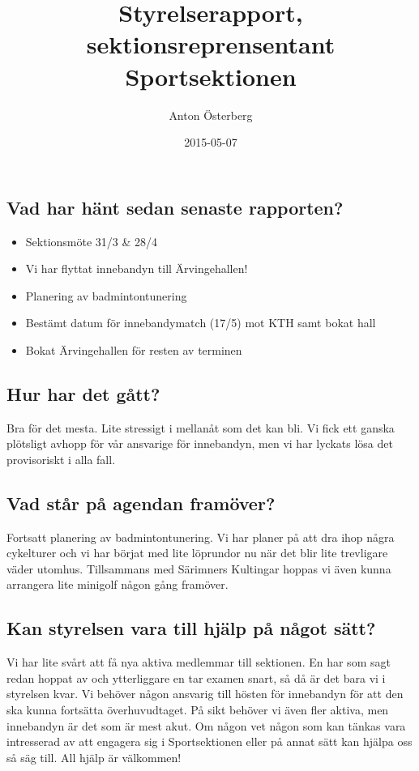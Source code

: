 \documentclass[a4paper]{article}
\begin{document}
	\title{\Huge Styrelserapport, sektionsreprensentant Sportsektionen}
	\author{Anton Österberg}
	\date{2015-05-07}
	\maketitle

	\null
	\vfill

	\clearpage

	\subsection{Vad har hänt sedan senaste rapporten?}
	\begin{itemize}
		\item Sektionsmöte 31/3 \& 28/4
		\item Vi har flyttat innebandyn till Ärvingehallen!
		\item Planering av badmintontunering
		\item Bestämt datum för innebandymatch (17/5) mot KTH samt bokat hall
		\item Bokat Ärvingehallen för resten av terminen
	\end{itemize}
	\subsection{Hur har det gått?}
	Bra för det mesta. Lite stressigt i mellanåt som det kan bli. Vi fick ett ganska plötsligt avhopp för vår ansvarige för innebandyn, men vi har lyckats lösa det provisoriskt i alla fall.
	\subsection{Vad står på agendan framöver?}
	Fortsatt planering av badmintontunering. Vi har planer på att dra ihop några cykelturer och vi har börjat med lite löprundor nu när det blir lite trevligare väder utomhus. Tillsammans med Särimners Kultingar hoppas vi även kunna arrangera lite minigolf någon gång framöver.

	\subsection{Kan styrelsen vara till hjälp på något sätt?}
	Vi har lite svårt att få nya aktiva medlemmar till sektionen. En har som sagt redan hoppat av och ytterliggare en tar examen snart, så då är det bara vi i styrelsen kvar. Vi behöver någon ansvarig till hösten för innebandyn för att den ska kunna fortsätta överhuvudtaget. På sikt behöver vi även fler aktiva, men innebandyn är det som är mest akut. Om någon vet någon som kan tänkas vara intresserad av att engagera sig i Sportsektionen eller på annat sätt kan hjälpa oss så säg till. All hjälp är välkommen!
\end{document}

